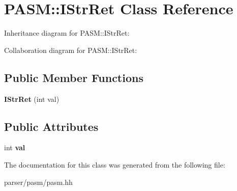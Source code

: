 \hypertarget{classPASM_1_1IStrRet}{}\section{P\+A\+SM\+:\+:I\+Str\+Ret Class Reference}
\label{classPASM_1_1IStrRet}


Inheritance diagram for P\+A\+SM\+:\+:I\+Str\+Ret\+:


Collaboration diagram for P\+A\+SM\+:\+:I\+Str\+Ret\+:
\subsection*{Public Member Functions}
\begin{DoxyCompactItemize}
\item 
\mbox{\label{classPASM_1_1IStrRet_ab450075787d8411217de67a9fbc14e89}} 
{\bfseries I\+Str\+Ret} (int val)
\end{DoxyCompactItemize}
\subsection*{Public Attributes}
\begin{DoxyCompactItemize}
\item 
\mbox{\label{classPASM_1_1IStrRet_a451ae77d6a03dab2a5433757520298d6}} 
int {\bfseries val}
\end{DoxyCompactItemize}


The documentation for this class was generated from the following file\+:\begin{DoxyCompactItemize}
\item 
parser/pasm/pasm.\+hh\end{DoxyCompactItemize}
